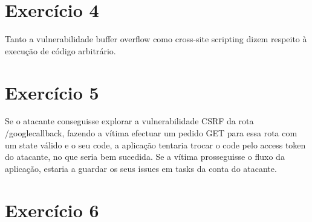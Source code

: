 \documentclass[11pt]{report}
\begin{document}
\section{Exercício 4}
	Tanto a vulnerabilidade buffer overflow como cross-site scripting dizem respeito à execução de código arbitrário.

\section{Exercício 5}
Se o atacante conseguisse explorar a vulnerabilidade CSRF da rota /googlecallback, fazendo a vítima efectuar um pedido GET para essa rota com um state válido e o seu code, a aplicação tentaria trocar o code pelo access token do atacante, no que seria bem sucedida. Se a vítima prosseguisse o fluxo da aplicação, estaria a guardar os seus issues em tasks da conta do atacante.

\newpage

\section{Exercício 6}
	
\newpage
\end{document}
